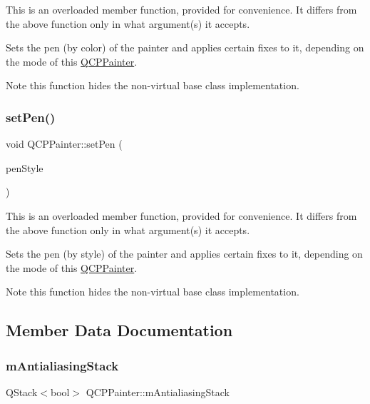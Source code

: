 This is an overloaded member function, provided for convenience. It differs from the above function only in what argument(s) it accepts.

Sets the pen (by color) of the painter and applies certain fixes to it, depending on the mode of this \mbox{\hyperlink{class_q_c_p_painter}{Q\+C\+P\+Painter}}.

\begin{DoxyNote}{Note}
this function hides the non-\/virtual base class implementation. 
\end{DoxyNote}
\mbox{\label{class_q_c_p_painter_a25e76095aae41da0d08035060e5f81ca}} 
\subsubsection{\texorpdfstring{setPen()}{setPen()}\hspace{0.1cm}{\footnotesize\ttfamily [3/3]}}
{\footnotesize\ttfamily void Q\+C\+P\+Painter\+::set\+Pen (\begin{DoxyParamCaption}\item[{Qt\+::\+Pen\+Style}]{pen\+Style }\end{DoxyParamCaption})}

This is an overloaded member function, provided for convenience. It differs from the above function only in what argument(s) it accepts.

Sets the pen (by style) of the painter and applies certain fixes to it, depending on the mode of this \mbox{\hyperlink{class_q_c_p_painter}{Q\+C\+P\+Painter}}.

\begin{DoxyNote}{Note}
this function hides the non-\/virtual base class implementation. 
\end{DoxyNote}


\subsection{Member Data Documentation}
\mbox{\label{class_q_c_p_painter_a0189e641bbf7dc31ac15aef7b36501fa}} 
\subsubsection{\texorpdfstring{mAntialiasingStack}{mAntialiasingStack}}
{\footnotesize\ttfamily Q\+Stack$<$bool$>$ Q\+C\+P\+Painter\+::m\+Antialiasing\+Stack\hspace{0.3cm}{\ttfamily [protected]}}

